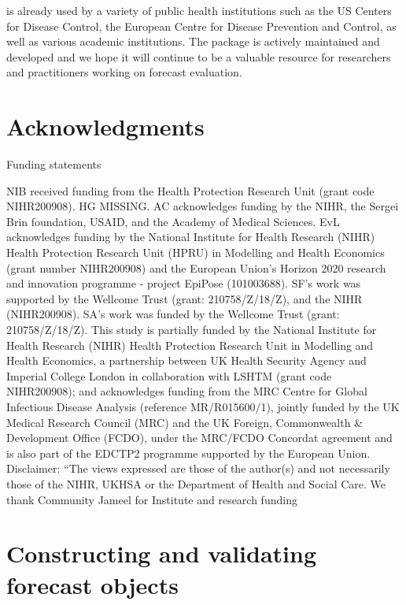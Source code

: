\documentclass[
]{jss}
\begin{document}
 is already used by a variety of public health
institutions such as the US Centers for Disease Control, the European
Centre for Disease Prevention and Control, as well as various academic
institutions. The package is actively maintained and developed and we
hope it will continue to be a valuable resource for researchers and
practitioners working on forecast evaluation.

\section{Acknowledgments}\label{acknowledgments}

Funding statements

NIB received funding from the Health Protection Research Unit (grant
code NIHR200908). HG MISSING. AC acknowledges funding by the NIHR, the
Sergei Brin foundation, USAID, and the Academy of Medical Sciences. EvL
acknowledges funding by the National Institute for Health Research
(NIHR) Health Protection Research Unit (HPRU) in Modelling and Health
Economics (grant number NIHR200908) and the European Union's Horizon
2020 research and innovation programme - project EpiPose (101003688).
SF's work was supported by the Wellcome Trust (grant: 210758/Z/18/Z),
and the NIHR (NIHR200908). SA's work was funded by the Wellcome Trust
(grant: 210758/Z/18/Z). This study is partially funded by the National
Institute for Health Research (NIHR) Health Protection Research Unit in
Modelling and Health Economics, a partnership between UK Health Security
Agency and Imperial College London in collaboration with LSHTM (grant
code NIHR200908); and acknowledges funding from the MRC Centre for
Global Infectious Disease Analysis (reference MR/R015600/1), jointly
funded by the UK Medical Research Council (MRC) and the UK Foreign,
Commonwealth \& Development Office (FCDO), under the MRC/FCDO Concordat
agreement and is also part of the EDCTP2 programme supported by the
European Union. Disclaimer: ``The views expressed are those of the
author(s) and not necessarily those of the NIHR, UKHSA or the Department
of Health and Social Care. We thank Community Jameel for Institute and
research funding



\clearpage

\appendix
\renewcommand\thefigure{\thesection.\arabic{figure}}

\section{Constructing and validating forecast objects}
\end{document}
